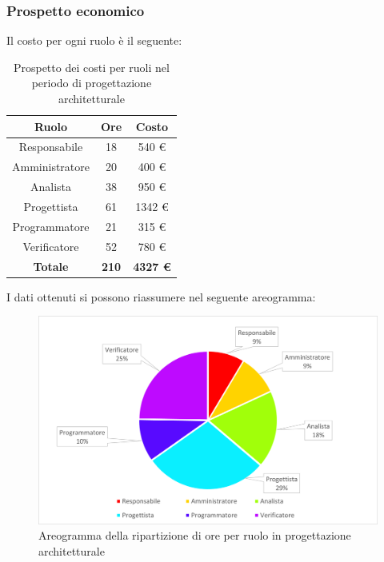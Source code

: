 \subsubsection{Prospetto economico}
Il costo per ogni ruolo è il seguente:
\begin{table}[H]
		\begin{center}
			\setlength{\aboverulesep}{0pt}
			\setlength{\belowrulesep}{0pt}
			\setlength{\extrarowheight}{.75ex}
			\begin{tabular}{ c c c }
				\rowcolor{AzzurroGruppo!30} 
				\textbf{Ruolo} & \textbf{Ore} & \textbf{Costo} \\
				\toprule
				Responsabile   & 18 & 540 \euro \\
				Amministratore & 20 & 400 \euro \\
				Analista       & 38 & 950 \euro \\
				Progettista    & 61 & 1342 \euro \\
				Programmatore  & 21 & 315 \euro \\
				Verificatore   & 52 & 780 \euro \\
				\textbf{Totale} & \textbf{210} & \textbf{4327 \euro} \\
				\bottomrule
			\end{tabular}
			\caption{ Prospetto dei costi per ruoli nel periodo di progettazione architetturale}
		\end{center}
	\end{table}
I dati ottenuti si possono riassumere nel seguente areogramma:
\begin{figure}[H]
    \centering
    \includegraphics[scale = 0.5]{components/img/Architettura-torta.png}
    \caption{ Areogramma della ripartizione di ore per ruolo in progettazione architetturale}
    \label{fig:Areogramma ripartizione ore, fase di progettazione architetturale}
\end{figure}
